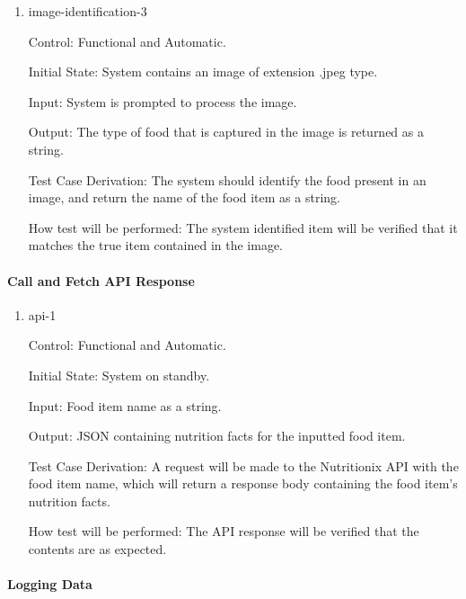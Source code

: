 \documentclass[12pt, titlepage]{article}
\begin{document}
\begin{enumerate}
		\item{image-identification-3\\}
		
		Control: Functional and Automatic.
		
		Initial State: System contains an image of extension .jpeg type.
		
		Input: System is prompted to process the image.
		
		Output: The type of food that is captured in the image is returned as a 
		string.
		
		Test Case Derivation: The system should identify the food present in an 
		image, and return the name of the food item as a string.
		
		How test will be performed: The system identified item will be verified 
		that it matches the true item contained in the image.
		
	\end{enumerate}
	
	\paragraph{Call and Fetch API Response}
	
	\begin{enumerate}
		
		\item{api-1\\}
		
		Control: Functional and Automatic.
		
		Initial State: System on standby.
		
		Input: Food item name as a string.
		
		Output: JSON containing nutrition facts for the inputted food item.
		
		Test Case Derivation: A request will be made to the Nutritionix API 
		with the food item name, which will return a response body containing 
		the food item's nutrition facts.
		
		How test will be performed: The API response will be verified that the 
		contents are as expected.
		
	\end{enumerate}
	
	\paragraph{Logging Data}
	
\end{document}
